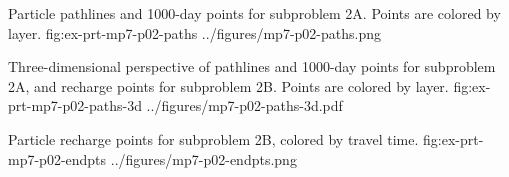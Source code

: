 \begin{StandardFigure}{
	Particle pathlines and 1000-day points for subproblem 2A. Points are colored by layer.
}
	{fig:ex-prt-mp7-p02-paths}
	{../figures/mp7-p02-paths.png}
\end{StandardFigure}

\begin{StandardFigure}{
	Three-dimensional perspective of pathlines and 1000-day points for subproblem 2A, and recharge points for subproblem 2B. Points are colored by layer.
}
	{fig:ex-prt-mp7-p02-paths-3d}
	{../figures/mp7-p02-paths-3d.pdf}
\end{StandardFigure}

\begin{StandardFigure}{
	Particle recharge points for subproblem 2B, colored by travel time.
}
	{fig:ex-prt-mp7-p02-endpts}
	{../figures/mp7-p02-endpts.png}
\end{StandardFigure}